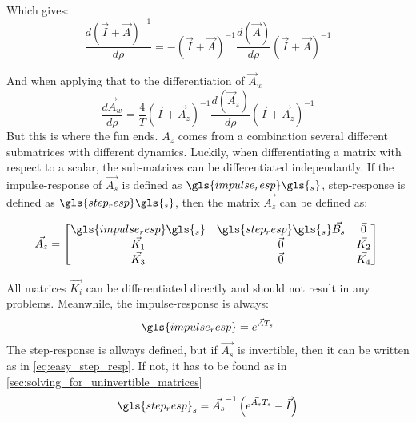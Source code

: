 Which gives: 
\begin{equation}
 \frac{d (\Vec{I}+\Vec{A})^{-1}}{d \rho} = - (\Vec{I}+\Vec{A})^{-1}\frac{d (\Vec{A})}{d \rho} (\Vec{I}+\Vec{A})^{-1} 
\end{equation}{}

And when applying that to the differentiation of $\Vec{A}_w$
\begin{equation}
 \frac{d \Vec{A}_w}{d \rho} = \frac{4}{T} (\Vec{I}+\Vec{A}_z)^{-1}\frac{d (\Vec{A}_z)}{d \rho} (\Vec{I}+\Vec{A}_z)^{-1}
\end{equation}{}
But this is where the fun ends. $A_z$ comes from a combination several different submatrices with different dynamics. Luckily, when differentiating a matrix with respect to a scalar, the sub-matrices can be differentiated independantly. If the impulse-response of $\Vec{A_s}$ is defined as $\gls{impulse_resp}\gls{_s}$, step-response is defined as $\gls{step_resp}\gls{_s}$, then the matrix $\Vec{A_z}$ can be defined as: 

\begin{equation}
 \Vec{A_z} = 
 \begin{bmatrix}
 \gls{impulse_resp}\gls{_s} & \gls{step_resp}\gls{_s}\Vec{B_s} & \Vec{0}\\
 \Vec{K_1} & \Vec{0} & \Vec{K_2}\\
 \Vec{K_3} & \Vec{0} & \Vec{K_4}
 \end{bmatrix}{}
\end{equation}{}

All matrices $\Vec{K_i}$ can be differentiated directly and should not result in any problems. Meanwhile, the impulse-response is always:
\begin{equation}
 \gls{impulse_resp} = e^{\Vec{A} T_s}
\end{equation}
The step-response is allways defined, but if $\Vec{A_s}$ is invertible, then it can be written as in \cref{eq:easy_step_resp}. If not, it has to be found as in \cref{sec:solving_for_uninvertible_matrices}
\begin{equation}
 \gls{step_resp}_s = \Vec{A_s}^{-1}\left( e^{\Vec{A_s}T_s} - \Vec{I}\right)
 \label{eq:easy_step_resp}
\end{equation} 




